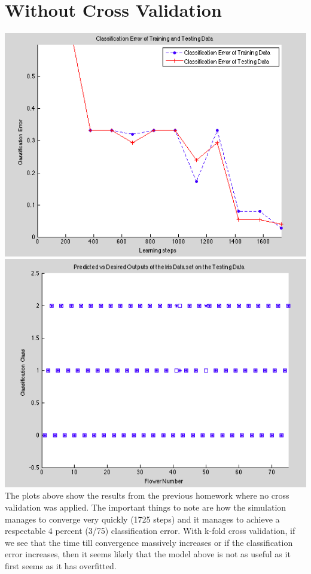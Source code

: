\documentclass[epsfig]{article}
\begin{document}
 \section*{Without Cross Validation}
 \includegraphics[scale=0.5]{pic1}
 \includegraphics[scale=0.5]{pic2}
 The plots above show the results from the previous homework where no cross validation was applied. The important things to note are how the simulation manages to converge very quickly (1725 steps) and it manages to achieve a respectable 4 percent (3/75) classification error. With k-fold cross validation, if we see that the time till convergence massively increases or if the classification error increases, then it seems likely that the model above is not as useful as it first seems as it has overfitted.
\end{document}

